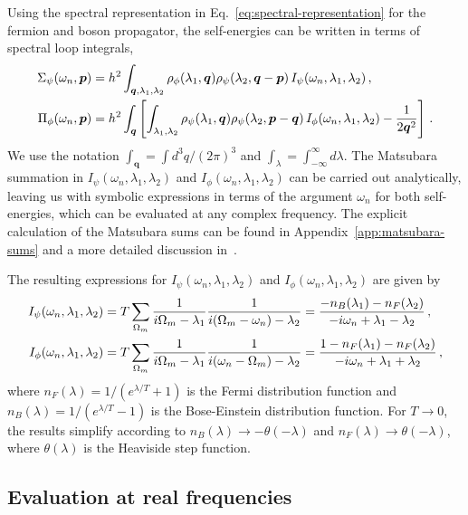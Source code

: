 Using the spectral representation in Eq.~\eqref{eq:spectral-representation} for the fermion and boson propagator, the self-energies can be written in terms of spectral loop integrals, 
%
\begin{align}
	\label{eq:spectral-self-energies}
	\Sigma_{\psi}(\omega_n,\bm{p}) &= h^2\int_{\bm{q},\lambda_1,\lambda_2}
	\rho_{\phi}(\lambda_1,\bm{q}) \rho_{\psi}(\lambda_2,\bm{q}-\bm{p})\,
	I_{\psi}(\omega_n,\lambda_1,\lambda_2) \,, \notag \\
	\Pi_{\phi}(\omega_n,\bm{p}) &= h^2\int_{\bm{q}} \left[\int_{\lambda_1,\lambda_2}
	\rho_{\psi}(\lambda_1,\bm{q}) \rho_{\psi}(\lambda_2,\bm{p}-\bm{q})\,
	I_{\phi}(\omega_n,\lambda_1,\lambda_2) - \frac{1}{2\bm{q}^2} \right] \,.
\end{align}
%
We use the notation $\int_{\bm{q}}=\int d^3q/(2\pi)^3$ and $\int_{\lambda}=\int_{-\infty}^{\infty}d\lambda$. The Matsubara summation in $I_{\psi}(\omega_n,\lambda_1,\lambda_2)$ and $I_{\phi}(\omega_n,\lambda_1,\lambda_2)$ can be carried out analytically, leaving us with symbolic expressions in terms of the argument $\omega_n$ for both self-energies, which can be evaluated at any complex frequency. The explicit calculation of the Matsubara sums can be found in Appendix~\ref{app:matsubara-sums} and a more detailed discussion in~\cite{Punk2010}.

The resulting expressions for $I_{\psi}(\omega_n,\lambda_1,\lambda_2)$ and $I_{\phi}(\omega_n,\lambda_1,\lambda_2)$ are given by
%
\begin{align}
	\label{eq:spectral-sums}
	I_{\psi}(\omega_n,\lambda_1,\lambda_2) &= T\sum_{\Omega_m} \frac{1}{i\Omega_m-\lambda_1}\frac{1}{i(\Omega_m-\omega_n)-\lambda_2} = \frac{-n_B(\lambda_1)-n_F(\lambda_2)}{-i\omega_n+\lambda_1-\lambda_2} \,, \notag \\
	I_{\phi}(\omega_n,\lambda_1,\lambda_2) &= T\sum_{\Omega_m} \frac{1}{i\Omega_m-\lambda_1}\frac{1}{i(\omega_n-\Omega_m)-\lambda_2} = \frac{1-n_F(\lambda_1)-n_F(\lambda_2)}{-i\omega_n+\lambda_1+\lambda_2} \,,
\end{align}
%
where $n_F(\lambda)=1/(e^{\lambda/T}+1)$ is the Fermi distribution function and $n_B(\lambda)=1/(e^{\lambda/T}-1)$ is the Bose-Einstein distribution function. For $T\rightarrow0$, the results simplify according to $n_B(\lambda)\rightarrow-\theta(-\lambda)$ and $n_F(\lambda)\rightarrow\theta(-\lambda)$, where $\theta(\lambda)$ is the Heaviside step function.

\subsection*{Evaluation at real frequencies}
\label{sec:evaluation-real-frequencies}

